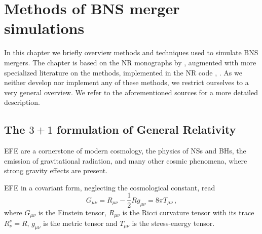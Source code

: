 \chapter{Methods of BNS merger simulations}\label{ch:nr_methods}

In this chapter we briefly overview methods and 
techniques used to simulate \ac{BNS} mergers. 
%
The chapter is based on the \ac{NR} monographs by 
\citet{Alcubierre:2008,Baumgarte:2010,Rezzolla:2013}, 
augmented with more specialized literature on the 
methods, implemented in the \ac{NR} code \wisky{}, 
\citep{Radice:2012cu,Radice:2016dwd,Radice:2017zta,Radice:2018pdn,Radice:2020ids}.
%
As we neither develop nor implement any of these methods, 
we restrict ourselves to a very general overview.
We refer to the aforementioned sources for a more detailed description.
%



\section{The $3+1$ formulation of General Relativity}\label{sec:nr_methods:nr}


\ac{EFE} are a cornerstone of modern cosmology, the physics of 
\acp{NS} and \acp{BH}, the emission of gravitational radiation, 
and many other cosmic phenomena, where strong gravity effects are present. 

\ac{EFE} in a covariant form, neglecting the cosmological constant, read
%
\begin{equation}
G_{\mu\nu} = R_{\mu\nu} - \frac{1}{2} R g_{\mu\nu} = 8\pi T_{\mu\nu}\, ,
\label{eq:theory:EFE}
\end{equation}
%
%
where $G_{\mu\nu}$ is the Einstein tensor, 
$R_{\mu\nu}$ is the Ricci curvature tensor with its trace 
$R^{\nu}_{\nu} = R$, $g_{\mu\nu}$ is the metric tensor and 
$T_{\mu\nu}$ is the stress-energy tensor.

